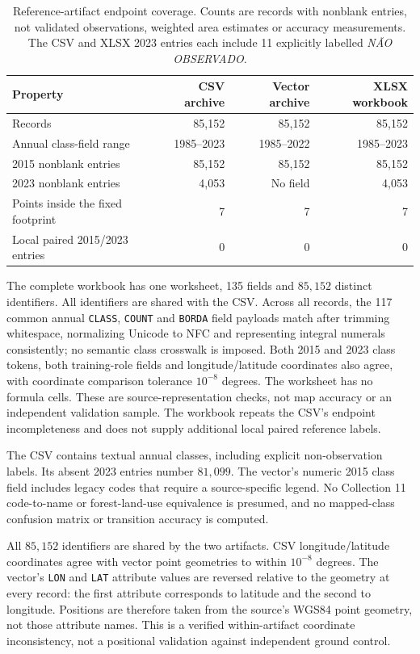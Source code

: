\documentclass[11pt,a4paper]{article}
\begin{document}
\begin{table}[htbp]
\centering\small
\caption{Reference-artifact endpoint coverage. Counts are records with nonblank entries, not validated observations, weighted area estimates or accuracy measurements. The CSV and XLSX 2023 entries each include 11 explicitly labelled \emph{N\~AO OBSERVADO}.}\label{tab:reference_coverage}
\begin{tabular}{lrrr}
\toprule
Property & CSV archive & Vector archive & XLSX workbook\\\midrule
Records & 85,152 & 85,152 & 85,152\\
Annual class-field range & 1985--2023 & 1985--2022 & 1985--2023\\
2015 nonblank entries & 85,152 & 85,152 & 85,152\\
2023 nonblank entries & 4,053 & No field & 4,053\\
Points inside the fixed footprint & 7 & 7 & 7\\
Local paired 2015/2023 entries & 0 & 0 & 0\\\bottomrule
\end{tabular}
\end{table}

The complete workbook has one worksheet, 135 fields and $85{,}152$ distinct identifiers. All identifiers are shared with the CSV. Across all records, the 117 common annual \texttt{CLASS}, \texttt{COUNT} and \texttt{BORDA} field payloads match after trimming whitespace, normalizing Unicode to NFC and representing integral numerals consistently; no semantic class crosswalk is imposed. Both 2015 and 2023 class tokens, both training-role fields and longitude/latitude coordinates also agree, with coordinate comparison tolerance $10^{-8}$ degrees. The worksheet has no formula cells. These are source-representation checks, not map accuracy or an independent validation sample. The workbook repeats the CSV's endpoint incompleteness and does not supply additional local paired reference labels.

The CSV contains textual annual classes, including explicit non-observation labels. Its absent 2023 entries number $81{,}099$. The vector's numeric 2015 class field includes legacy codes that require a source-specific legend. No Collection 11 code-to-name or forest-land-use equivalence is presumed, and no mapped-class confusion matrix or transition accuracy is computed.

All $85{,}152$ identifiers are shared by the two artifacts. CSV longitude/latitude coordinates agree with vector point geometries to within $10^{-8}$ degrees. The vector's \texttt{LON} and \texttt{LAT} attribute values are reversed relative to the geometry at every record: the first attribute corresponds to latitude and the second to longitude. Positions are therefore taken from the source's WGS84 point geometry, not those attribute names. This is a verified within-artifact coordinate inconsistency, not a positional validation against independent ground control.
\end{document}
